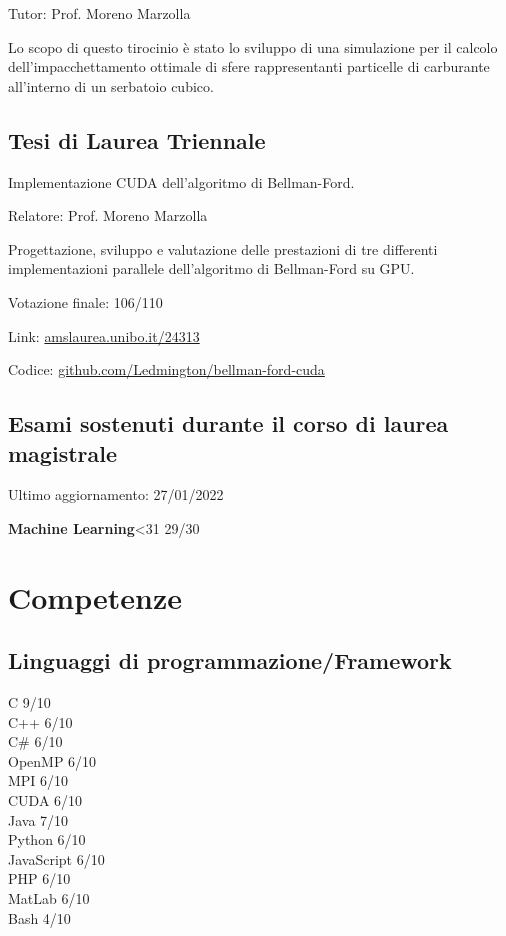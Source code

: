 \documentclass{article}
\newcommand{\https}[1]{\href{https://#1}{#1}}
\newcommand{\exam}[2]{\textbf{#1}\hfill \ifnum #2<31 {\Large #2}{\small /30} \else {\Large 30}{\small /30 con lode} \fi\\}
\newcommand{\skill}[2]{#1 #2/10}
\begin{document}
	Tutor: Prof. Moreno Marzolla
	
	Lo scopo di questo tirocinio è stato lo sviluppo di una simulazione per il calcolo dell'impacchettamento ottimale di sfere rappresentanti particelle di carburante all'interno di un serbatoio cubico.
	
	\subsection*{Tesi di Laurea Triennale}
	Implementazione CUDA dell'algoritmo di Bellman-Ford.
	
	Relatore: Prof. Moreno Marzolla
	
	Progettazione, sviluppo e valutazione delle prestazioni di tre differenti implementazioni parallele dell'algoritmo di Bellman-Ford su GPU.
	
	Votazione finale: 106/110
	
	Link: \https{amslaurea.unibo.it/24313}
	
	Codice: \https{github.com/Ledmington/bellman-ford-cuda}
	
	\subsection*{Esami sostenuti durante il corso di laurea magistrale}
	{\small Ultimo aggiornamento: 27/01/2022}
	\medskip
	
	\begin{minipage}[t]{.47\textwidth}
		\exam{Machine Learning}{29}
	\end{minipage}
	\hfill
	\begin{minipage}[t]{.47\textwidth}
	\end{minipage}
	
	\section*{Competenze}
	\subsection*{Linguaggi di programmazione/Framework}
	\skill{C}{9}\\
	\skill{C++}{6}\\
	\skill{C\#}{6}\\
	\skill{OpenMP}{6}\\
	\skill{MPI}{6}\\
	\skill{CUDA}{6}\\
	\skill{Java}{7}\\
	\skill{Python}{6}\\
	\skill{JavaScript}{6}\\
	\skill{PHP}{6}\\
	\skill{MatLab}{6}\\
	\skill{Bash}{4}
	
\end{document}

